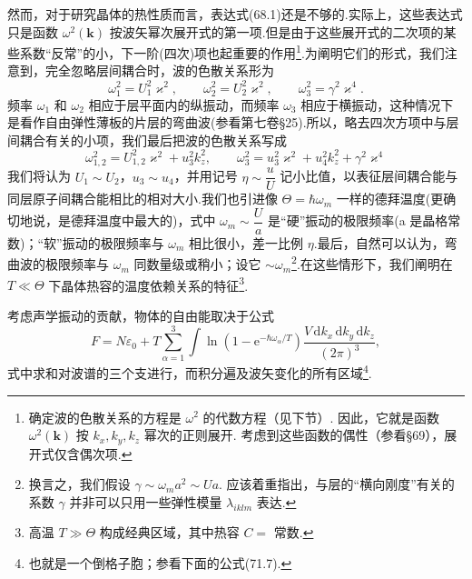 然而，对于研究晶体的热性质而言，表达式(68.1)还是不够的.实际上，这些表达式只是函数 $\omega^2(\boldsymbol{k})$ 按波矢幂次展开式的第一项.但是由于这些展开式的二次项的某些系数“反常”的小，下一阶(四次)项也起重要的作用\footnote{确定波的色散关系的方程是 $\omega^2$ 的代数方程（见下节）. 因此，它就是函数 $\omega^2(\boldsymbol{k})$ 按 $k_x,k_y,k_z$ 幂次的正则展开. 考虑到这些函数的偶性（参看§69），展开式仅含偶次项.}.为阐明它们的形式，我们注意到，完全忽略层间耦合时，波的色散关系形为
\begin{equation}
  \omega_1^2=U_1^2\varkappa^2,\qquad
  \omega_2^2=U_2^2\varkappa^2,\qquad
  \omega_3^2=\gamma^2\varkappa^4.
\end{equation}
频率 $\omega_1$ 和 $\omega_2$ 相应于层平面内的纵振动，而频率 $\omega_3$ 相应于横振动，这种情况下是看作自由弹性薄板的片层的弯曲波(参看第七卷§25).所以，略去四次方项中与层间耦合有关的小项，我们最后把波的色散关系写成
\begin{equation}
  \omega_{1,2}^2=U_{1,2}^2\varkappa^2+u_3^2k_z^2,\qquad
  \omega_3^2=u_3^2\varkappa^2+u_4^2k_z^2+\gamma^2\varkappa^4
\end{equation}
我们将认为 $U_1\sim U_2$，$u_3\sim u_4$，并用记号 $\eta\sim\dfrac{u}{U}$ 记小比值，以表征层间耦合能与同层原子间耦合能相比的相对大小.我们也引进像 $\Theta=\hbar\omega_m$ 一样的德拜温度(更确切地说，是德拜温度中最大的)，式中 $\omega_m\sim\dfrac{U}{a}$ 是“硬”振动的极限频率(a 是晶格常数)；“软”振动的极限频率与 $\omega_m$ 相比很小，差一比例 $\eta$.最后，自然可以认为，弯曲波的极限频率与 $\omega_m$ 同数量级或稍小；设它 $\sim\omega_m$\footnote{换言之，我们假设 $\gamma\sim\omega_m a^2\sim Ua$. 应该着重指出，与层的“横向刚度”有关的系数 $\gamma$ 并非可以只用一些弹性模量 $\lambda_{iklm}$ 表达.}.在这些情形下，我们阐明在 $T\ll\Theta$ 下晶体热容的温度依赖关系的特征\footnote{高温 $T\gg\Theta$ 构成经典区域，其中热容 $C=$ 常数.}.

考虑声学振动的贡献，物体的自由能取决于公式
\begin{equation}
  F=N\varepsilon_0+T\sum_{\alpha=1}^{3}\int\ln\left(1-\mathrm{e}^{-\hbar\omega_\alpha/T}\right)\frac{V\,\mathrm{d}k_x\,\mathrm{d}k_y\,\mathrm{d}k_z}{(2\pi)^3},
\end{equation}
式中求和对波谱的三个支进行，而积分遍及波矢变化的所有区域\footnote{也就是一个倒格子胞；参看下面的公式(71.7).}.

